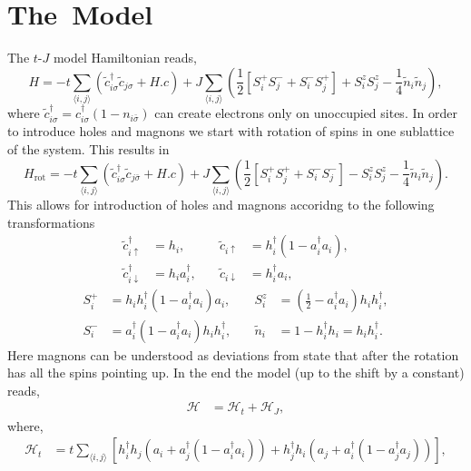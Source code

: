 \documentclass[12pt, a4paper]{article}
\newcommand{\mean}[1]{\langle#1\rangle}
\begin{document}
\section{The~Model}
The $t$-$J$ model Hamiltonian reads,
\begin{equation}
	H = -t\sum_{\mean{i,j}}\left(\tilde{c}_{i\sigma}^\dagger\tilde{c}_{j\sigma} + H.c\right)
	+ J\sum_{\mean{i,j}}\left(\frac{1}{2}\left[S_i^+S_j^- + S_i^-S_j^+\right] + S_i^zS_j^z - \frac{1}{4}\tilde{n}_i\tilde{n}_j\right),
\end{equation}
where $\tilde{c}_{i\sigma}^\dagger = c_{i\sigma}^\dagger(1-n_{i\bar{\sigma}})$ can create electrons only on unoccupied sites. In order to introduce holes and magnons we start with rotation of spins in one sublattice of the system. This results in
\begin{equation}
	H_{\text{rot}} = -t\sum_{\mean{i,j}}\left(\tilde{c}_{i\sigma}^\dagger\tilde{c}_{j\bar{\sigma}} + H.c\right)
	+ J\sum_{\mean{i,j}}\left(\frac{1}{2}\left[S_i^+S_j^+ + S_i^-S_j^-\right] - S_i^zS_j^z - \frac{1}{4}\tilde{n}_i\tilde{n}_j\right).
\end{equation}
This allows for introduction of holes and magnons accoridng to the following transformations
\begin{equation}
	\begin{aligned}
	\tilde{c}_{i\uparrow}^\dag &= h_i, &\quad \tilde{c}_{i\uparrow} &= h_i^\dag (1 - a_i^\dag a_i), \\
	\tilde{c}_{i\downarrow}^\dag &= h_i a_i^\dag, &\quad \tilde{c}_{i\downarrow} &= h_i^\dag a_i,
	\end{aligned}
\end{equation}
\begin{equation}
	\begin{aligned}
		S_i^+ &= h_i h_i^\dag (1 - a_i^\dag a_i)a_i, &\quad S_i^z &= (\frac{1}{2} - a_i^\dag a_i) h_i h_i^\dag, \\
		S_i^- &= a_i^\dag (1 - a_i^\dag a_i) h_i h_i^\dag, &\quad \tilde{n}_i &= 1 - h_i^\dag h_i = h_i h_i^\dag.
	\end{aligned}
\end{equation}
Here magnons can be understood as deviations from state that after the rotation has all the spins pointing up. In the end the model (up to the shift by a constant) reads,
\begin{align}
	\mathcal{H} &= \mathcal{H}_{t} + \mathcal{H}_{J},
\end{align}
	where,
\begin{equation}
	\begin{split}
	\mathcal{H}_{t} &= t \sum_{\mean{i,j}} \left[h_i^\dag h_j \left( a_i + a_j^\dag (1 -  a_i^\dag a_i) \right) + h_j^\dag h_i \left( a_j + a_i^\dag (1 -  a_j^\dag a_j) \right)\right],
	\end{split}
	\label{eq:ht}
\end{equation}
\end{document}
